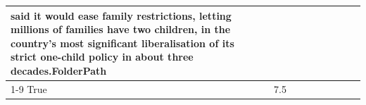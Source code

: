 \begin{table}[H]
\begin{tabular}{lllrlllll}
said it would ease family restrictions, letting millions of families have two children, in the country's most significant liberalisation of its strict one-child policy in about three decades.FolderPath \\
\cline{1-9}
True & 7.5%
\end{tabular}
\end{table}
